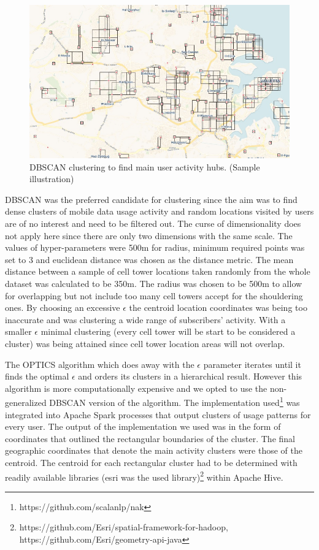 \documentclass[12pt, a4paper]{report}
\theoremstyle{definition}
\theoremstyle{definition}%
\theoremstyle{definition}%
\theoremstyle{definition}%
\theoremstyle{definition}%
\theoremstyle{definition}%
\begin{document}
\begin{figure}[!]	
	\includegraphics[scale=0.60]{clustering.jpg}
	\centering
	\caption[DBSCAN clustering]{DBSCAN clustering to find main user activity hubs. (Sample illustration)}
	\label{fig:db_scan_clustering}
\end{figure}
 

DBSCAN was the preferred candidate for clustering since the aim was to find dense clusters of mobile data usage activity and random locations visited by users are of no interest and need to be filtered out. The curse of dimensionality does not apply here since there are only two dimensions with the same scale.  The values of hyper-parameters were 500m for radius, minimum required points was set to 3 and euclidean distance was chosen as the distance metric. The mean distance between a sample of cell tower locations taken randomly from the whole dataset was calculated to be 350m. The radius was chosen to be 500m to allow for overlapping but not include too many cell towers accept for the shouldering ones. By choosing an excessive $\epsilon$ the centroid location coordinates was being too inaccurate and was clustering a wide range of subscribers' activity. With a smaller $\epsilon$ minimal clustering (every cell tower will be start to be considered a cluster) was being attained since cell tower location areas will not overlap. 

The OPTICS algorithm which does away with the $\epsilon$ parameter iterates until it finds the optimal $\epsilon$ and orders its clusters in a hierarchical result. However this algorithm is more computationally expensive and we opted to use the non-generalized DBSCAN version of the algorithm. The implementation used\footnote{https://github.com/scalanlp/nak} was integrated into Apache Spark processes that output clusters of usage patterns for every user. The output of the implementation we used was in the form of coordinates that outlined the rectangular boundaries of the cluster. The final geographic coordinates that denote the main activity clusters were those of the centroid. The centroid for each rectangular cluster had to be determined with readily available libraries (esri was the used library)\footnote{https://github.com/Esri/spatial-framework-for-hadoop, https://github.com/Esri/geometry-api-java} within Apache Hive. 
\end{document}
